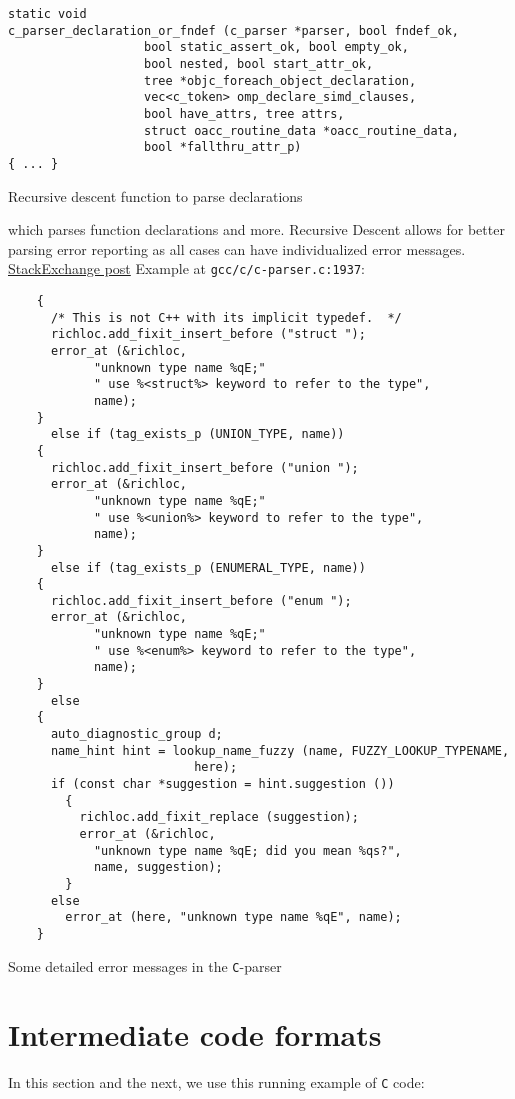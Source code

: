 \documentclass[11pt]{article}
\begin{document}
\begin{listing}[H]
\begin{verbatim}
static void
c_parser_declaration_or_fndef (c_parser *parser, bool fndef_ok,
			       bool static_assert_ok, bool empty_ok,
			       bool nested, bool start_attr_ok,
			       tree *objc_foreach_object_declaration,
			       vec<c_token> omp_declare_simd_clauses,
			       bool have_attrs, tree attrs,
			       struct oacc_routine_data *oacc_routine_data,
			       bool *fallthru_attr_p)
{ ... }
\end{verbatim}
\caption{Recursive descent function to parse declarations}
\end{listing}

which parses function declarations and more. Recursive Descent allows for
better parsing error reporting as all cases can have individualized error
messages. \href{https://softwareengineering.stackexchange.com/a/254707}{StackExchange post} Example at \texttt{gcc/c/c-parser.c:1937}:

\begin{listing}[H]
\begin{verbatim}
	{
	  /* This is not C++ with its implicit typedef.  */
	  richloc.add_fixit_insert_before ("struct ");
	  error_at (&richloc,
		    "unknown type name %qE;"
		    " use %<struct%> keyword to refer to the type",
		    name);
	}
      else if (tag_exists_p (UNION_TYPE, name))
	{
	  richloc.add_fixit_insert_before ("union ");
	  error_at (&richloc,
		    "unknown type name %qE;"
		    " use %<union%> keyword to refer to the type",
		    name);
	}
      else if (tag_exists_p (ENUMERAL_TYPE, name))
	{
	  richloc.add_fixit_insert_before ("enum ");
	  error_at (&richloc,
		    "unknown type name %qE;"
		    " use %<enum%> keyword to refer to the type",
		    name);
	}
      else
	{
	  auto_diagnostic_group d;
	  name_hint hint = lookup_name_fuzzy (name, FUZZY_LOOKUP_TYPENAME,
					      here);
	  if (const char *suggestion = hint.suggestion ())
	    {
	      richloc.add_fixit_replace (suggestion);
	      error_at (&richloc,
			"unknown type name %qE; did you mean %qs?",
			name, suggestion);
	    }
	  else
	    error_at (here, "unknown type name %qE", name);
	}
\end{verbatim}
\caption{Some detailed error messages in the \texttt{C}-parser}
\end{listing}
\section{Intermediate code formats}
\label{sec:org0d4d492}
In this section and the next, we use this running example of \texttt{C} code:
\end{document}
